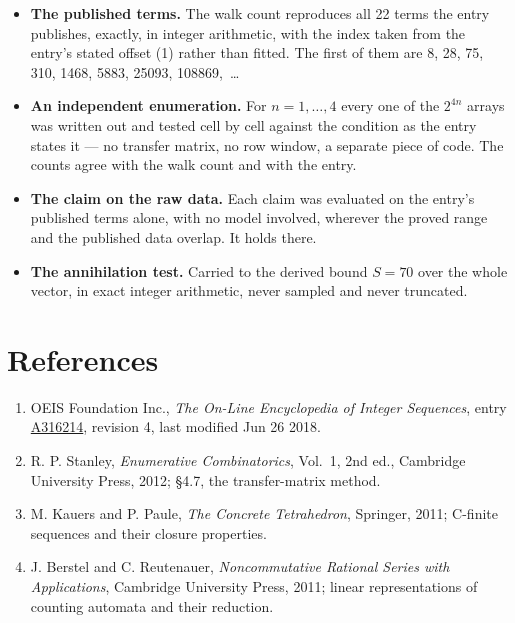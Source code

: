 \documentclass[11pt]{article}
\theoremstyle{definition}
\begin{document}
\begin{itemize}

\item {\bfseries The published terms.} The walk count reproduces all 22 terms the entry publishes, exactly, in integer arithmetic, with the index taken from the entry's stated offset (1) rather than fitted. The first of them are 8, 28, 75, 310, 1468, 5883, 25093, 108869,~\dots

\item {\bfseries An independent enumeration.} For $n = 1,\dots,4$ every one of the $2^{4n}$ arrays was written out and tested cell by cell against the condition as the entry states it --- no transfer matrix, no row window, a separate piece of code. The counts agree with the walk count and with the entry.

\item {\bfseries The claim on the raw data.} Each claim was evaluated on the entry's published terms alone, with no model involved, wherever the proved range and the published data overlap. It holds there.

\item {\bfseries The annihilation test.} Carried to the derived bound $S = 70$ over the whole vector, in exact integer arithmetic, never sampled and never truncated.

\end{itemize}

\section{References}

\begin{enumerate}

\item OEIS Foundation Inc., \emph{The On-Line Encyclopedia of Integer Sequences}, entry \href{https://oeis.org/A316214}{A316214}, revision 4, last modified Jun 26 2018.

\item R. P. Stanley, \emph{Enumerative Combinatorics}, Vol.~1, 2nd ed., Cambridge University Press, 2012; \S4.7, the transfer-matrix method.

\item M. Kauers and P. Paule, \emph{The Concrete Tetrahedron}, Springer, 2011; C-finite sequences and their closure properties.

\item J. Berstel and C. Reutenauer, \emph{Noncommutative Rational Series with Applications}, Cambridge University Press, 2011; linear representations of counting automata and their reduction.

\end{enumerate}
\end{document}
